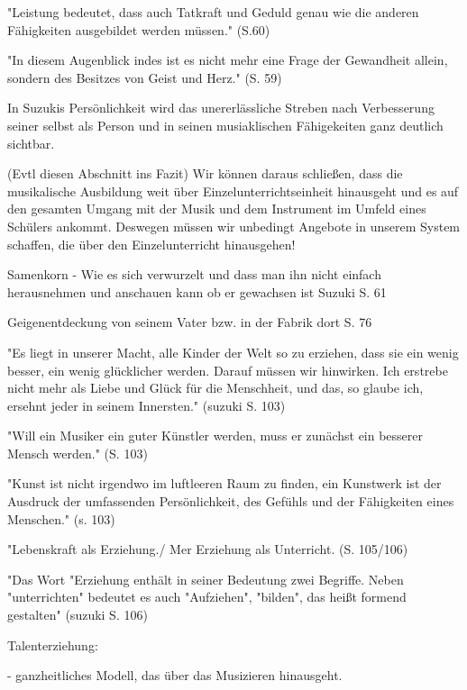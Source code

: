 "Leistung bedeutet, dass auch Tatkraft und Geduld genau wie die anderen
Fähigkeiten ausgebildet werden müssen." (S.60)

"In diesem Augenblick indes ist es nicht mehr eine Frage der Gewandheit allein,
sondern des Besitzes von Geist und Herz." (S. 59)

In Suzukis Persönlichkeit wird das unererlässliche Streben nach Verbesserung
seiner selbst als Person und in seinen musiaklischen Fähigekeiten ganz deutlich
sichtbar. 

(Evtl diesen Abschnitt ins Fazit)
Wir können daraus schließen, dass die musikalische Ausbildung weit über
Einzelunterrichtseinheit hinausgeht und es auf den gesamten Umgang mit der Musik
und dem Instrument im Umfeld eines Schülers ankommt. Deswegen müssen wir
unbedingt Angebote in unserem System schaffen, die über den Einzelunterricht
hinausgehen! 


Samenkorn
- Wie es sich verwurzelt und dass man ihn nicht einfach herausnehmen und
anschauen kann ob er gewachsen ist Suzuki S. 61

Geigenentdeckung von seinem Vater bzw. in der Fabrik dort S. 76


"Es liegt in unserer Macht, alle Kinder der Welt so zu erziehen, dass sie ein
wenig besser, ein wenig glücklicher werden. Darauf müssen wir hinwirken. Ich
erstrebe nicht mehr als Liebe und Glück für die Menschheit, und das, so glaube
ich, ersehnt jeder in seinem Innersten." (suzuki S. 103)

"Will ein Musiker ein guter Künstler werden, muss er zunächst ein besserer
Mensch werden." (S. 103)

"Kunst ist nicht irgendwo im luftleeren Raum zu finden, ein Kunstwerk ist der
Ausdruck der umfassenden Persönlichkeit, des Gefühls und der Fähigkeiten eines
Menschen." (s. 103)

"Lebenskraft als Erziehung./ Mer Erziehung als Unterricht. (S. 105/106)

"Das Wort "Erziehung enthält in seiner Bedeutung zwei Begriffe. Neben
"unterrichten" bedeutet es auch "Aufziehen", "bilden", das heißt formend
gestalten" (suzuki S. 106)


Talenterziehung:

- ganzheitliches Modell, das über das Musizieren hinausgeht.



